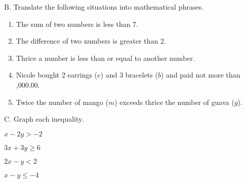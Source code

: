 B. Translate the following situations into mathematical phrases.
\begin{enumerate}[label = \arabic*. ]
\item The sum of two numbers is less than 7.
\item The difference of two numbers is greater than 2.
\item Thrice a number is less than or equal to another number.
\item Nicole bought 2 earrings ($e$) and 3 bracelets ($b$) and paid not more than ,000.00.
\item Twice the number of mango ($m$) exceeds thrice the number of guava ($g$).
\end{enumerate}  

C. Graph each inequality. 
\begin{enumerate}[label = \arabic*. ]
\begin{multicols}{2}
\item \hspce $x-2y > -2$
\item \hspce $3x+3y\geq 6$
\item \hspce $2x-y < 2$
\item \hspce $x-y \leq -4$

\end{multicols} 
\end{enumerate}   